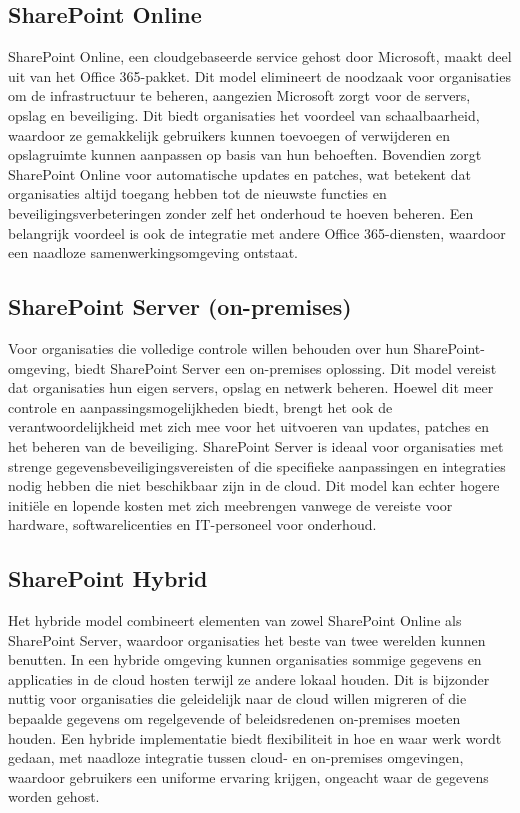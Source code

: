 \subsection{SharePoint Online}
SharePoint Online, een cloudgebaseerde service gehost door Microsoft, maakt deel uit van het Office 365-pakket. Dit model elimineert de noodzaak voor organisaties om de infrastructuur te beheren, aangezien Microsoft zorgt voor de servers, opslag en beveiliging. Dit biedt organisaties het voordeel van schaalbaarheid, waardoor ze gemakkelijk gebruikers kunnen toevoegen of verwijderen en opslagruimte kunnen aanpassen op basis van hun behoeften. Bovendien zorgt SharePoint Online voor automatische updates en patches, wat betekent dat organisaties altijd toegang hebben tot de nieuwste functies en beveiligingsverbeteringen zonder zelf het onderhoud te hoeven beheren. Een belangrijk voordeel is ook de integratie met andere Office 365-diensten, waardoor een naadloze samenwerkingsomgeving ontstaat.

\subsection{SharePoint Server (on-premises)}
Voor organisaties die volledige controle willen behouden over hun SharePoint-omgeving, biedt SharePoint Server een on-premises oplossing. Dit model vereist dat organisaties hun eigen servers, opslag en netwerk beheren. Hoewel dit meer controle en aanpassingsmogelijkheden biedt, brengt het ook de verantwoordelijkheid met zich mee voor het uitvoeren van updates, patches en het beheren van de beveiliging. SharePoint Server is ideaal voor organisaties met strenge gegevensbeveiligingsvereisten of die specifieke aanpassingen en integraties nodig hebben die niet beschikbaar zijn in de cloud. Dit model kan echter hogere initiële en lopende kosten met zich meebrengen vanwege de vereiste voor hardware, softwarelicenties en IT-personeel voor onderhoud.

\subsection{SharePoint Hybrid}
Het hybride model combineert elementen van zowel SharePoint Online als SharePoint Server, waardoor organisaties het beste van twee werelden kunnen benutten. In een hybride omgeving kunnen organisaties sommige gegevens en applicaties in de cloud hosten terwijl ze andere lokaal houden. Dit is bijzonder nuttig voor organisaties die geleidelijk naar de cloud willen migreren of die bepaalde gegevens om regelgevende of beleidsredenen on-premises moeten houden. Een hybride implementatie biedt flexibiliteit in hoe en waar werk wordt gedaan, met naadloze integratie tussen cloud- en on-premises omgevingen, waardoor gebruikers een uniforme ervaring krijgen, ongeacht waar de gegevens worden gehost.

